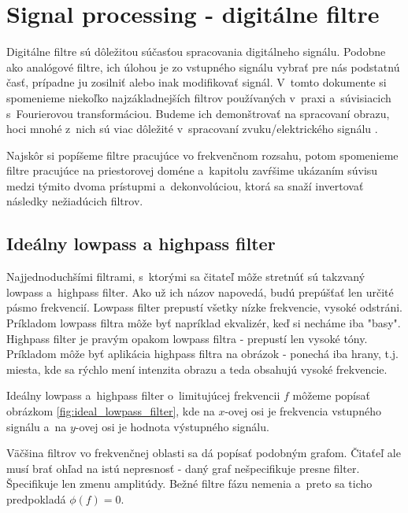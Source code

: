 \section{Signal processing - digitálne filtre}
Digitálne filtre sú dôležitou súčasťou spracovania digitálneho
signálu. Podobne ako analógové filtre, ich úlohou je zo vstupného
signálu vybrať pre nás podstatnú časť, prípadne ju zosilniť alebo inak
modifikovať signál. V~tomto dokumente si spomenieme niekoľko 
najzákladnejších filtrov používaných v~praxi a~súvisiacich s~Fourierovou
transformáciou. Budeme ich demonštrovať na spracovaní obrazu, hoci
mnohé z~nich sú viac dôležité v~spracovaní zvuku/elektrického signálu 
.

Najskôr si popíšeme filtre pracujúce vo frekvenčnom rozsahu, potom
spomenieme filtre pracujúce na priestorovej doméne a~kapitolu
zavŕšime ukázaním súvisu medzi týmito dvoma prístupmi 
a~dekonvolúciou, ktorá sa snaží invertovať následky nežiadúcich filtrov.

\subsection{Ideálny lowpass a highpass filter}

Najjednoduchšími filtrami, s~ktorými sa čitateľ môže stretnúť sú
takzvaný lowpass a~highpass filter. Ako už ich názov napovedá, budú
prepúšťať len určité pásmo frekvencií. Lowpass filter prepustí všetky
nízke frekvencie, vysoké odstráni. Príkladom lowpass filtra môže byť
napríklad ekvalizér, keď si necháme iba "basy". Highpass filter je
pravým opakom lowpass filtra - prepustí len vysoké tóny. Príkladom
môže byť aplikácia highpass filtra na obrázok - ponechá iba hrany,
t.j. miesta, kde sa rýchlo mení intenzita obrazu a teda obsahujú
vysoké frekvencie.

Ideálny lowpass a~highpass filter o~limitujúcej frekvencii $f$ môžeme
popísať obrázkom \ref{fig:ideal_lowpass_filter}, 
kde na $x$-ovej osi je frekvencia
vstupného signálu a~na $y$-ovej osi je hodnota výstupného signálu.
\begin{poznamka}
    Väčšina filtrov vo frekvenčnej oblasti sa dá popísať podobným grafom.
    Čitaťeľ ale musí brať ohľad na istú nepresnosť - daný graf
    nešpecifikuje presne filter. Špecifikuje len zmenu amplitúdy.
    Bežné filtre fázu nemenia a~preto sa ticho predpokladá $\phi(f)=0$.
\end{poznamka}

